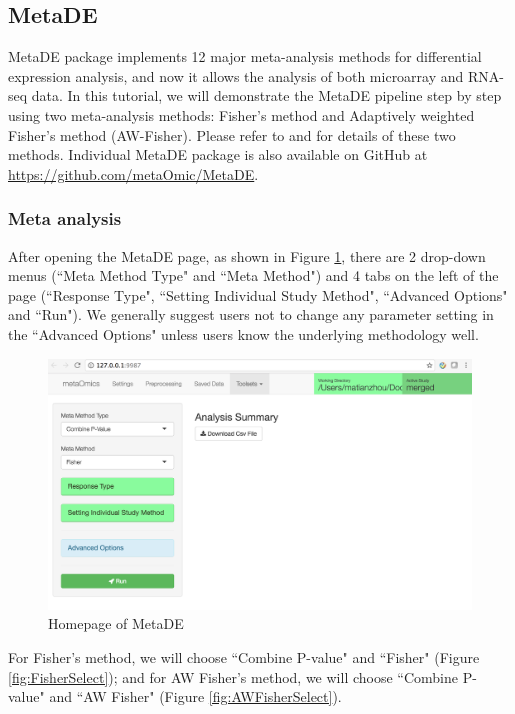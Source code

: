 \subsection{MetaDE}
MetaDE package implements 12 major meta-analysis methods for differential expression analysis, and now it allows the analysis of both microarray and RNA-seq data. In this tutorial, we will demonstrate the MetaDE pipeline step by step using two meta-analysis methods: Fisher's method and Adaptively weighted Fisher's method (AW-Fisher). Please refer to \cite{fisher1925statistical} and \cite{li2011adaptively} for details of these two methods. 
Individual MetaDE package is also available on GitHub at \url{https://github.com/metaOmic/MetaDE}.


\subsubsection{Meta analysis}

After opening the MetaDE page, as shown in Figure \ref{fig:MetaDEmainpage}, there are 2 drop-down menus (``Meta Method Type" and ``Meta Method") and 4 tabs on the left of the page (``Response Type", ``Setting Individual Study Method", ``Advanced Options" and ``Run"). We generally suggest users not to change any parameter setting in the ``Advanced Options" unless users know the underlying methodology well. 

\begin{figure}[H]
\begin{center}
\includegraphics[scale=0.45]{./figure/metaDE/MetaDEmainpage}
\caption{Homepage of MetaDE}
\label{fig:MetaDEmainpage}
\end{center}
\end{figure}

For Fisher's method, we will choose ``Combine P-value" and ``Fisher" (Figure \ref{fig:FisherSelect}); and for AW Fisher's method, we will choose ``Combine P-value" and ``AW Fisher" (Figure \ref{fig:AWFisherSelect}). 

